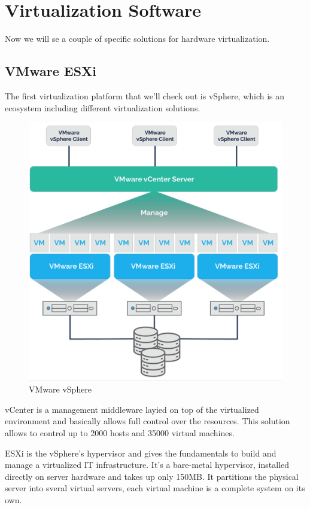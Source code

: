 \section{Virtualization Software}
Now we will se a couple of specific solutions for hardware virtualization.
\subsection{VMware ESXi}
The first virtualization platform that we'll check out is vSphere, which is an ecosystem including different virtualization solutions.
\begin{figure}
    \centering
    \includegraphics[scale=0.4]{img/ESXi.png}
    \caption{VMware vSphere}
\end{figure}
vCenter is a management middleware layied on top of the virtualized environment and basically allows full control over the resources. This solution allows to control up to 2000 hosts and 35000 virtual machines.

ESXi is the vSphere's hypervisor and gives the fundamentals to build and manage a virtualized IT infrastructure. It's a bare-metal hypervisor, installed directly on server hardware and takes up only 150MB. It partitions the physical server into sveral virtual servers, each virtual machine is a complete system on its own.

